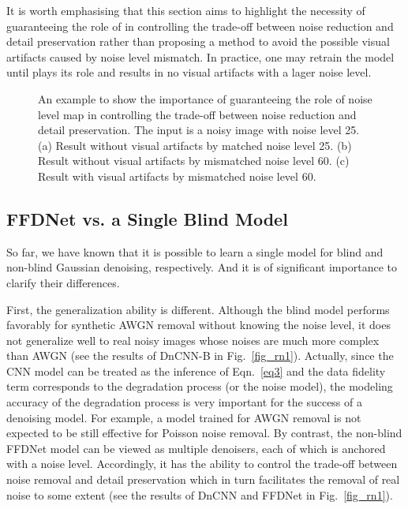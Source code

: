 \documentclass[journal]{IEEEtran}
\begin{document}
It is worth emphasising that this section aims to highlight the necessity of guaranteeing the role of  in controlling the trade-off between noise reduction and detail preservation rather than proposing a method to avoid the possible visual artifacts caused by noise level mismatch.
In practice, one may retrain the model until  plays its role and results in no visual artifacts with a lager noise level.

\begin{figure}[!tbp]\begin{center}
\caption{An example to show the importance of guaranteeing the role of noise level map in controlling the trade-off between noise reduction and detail preservation. The input is a noisy image with noise level 25. (a) Result without visual artifacts by matched noise level 25. (b) Result without visual artifacts by mismatched noise level 60. (c) Result with visual artifacts by mismatched noise level 60.}\label{fig_na1}
\end{center}\end{figure}


\subsection{{FFDNet vs. a Single Blind Model}}
So far, we have known that it is possible to learn a single model for blind and non-blind Gaussian denoising, respectively.
And it is of significant importance to clarify their differences.

First, the generalization ability is different. Although the blind model performs favorably for synthetic AWGN removal without knowing the noise level,
it does not generalize well to real noisy images whose noises are much more complex than AWGN (see the results of DnCNN-B in Fig.~\ref{fig_rn1}). Actually, since the CNN model can be
treated as the inference of Eqn.~\eqref{eq3} and the data fidelity term corresponds to the degradation process (or the noise model),
the modeling accuracy of the degradation process is very important for the success of a denoising model.
For example, a model trained for AWGN removal is not expected to be still effective for Poisson noise removal.
By contrast, the non-blind FFDNet model can be viewed as multiple denoisers,
each of which is anchored with a noise level.
Accordingly, it has the ability to control the trade-off between noise removal and detail preservation which in turn facilitates the removal of real noise to some extent (see the results of DnCNN and FFDNet in Fig.~\ref{fig_rn1}).
\end{document}

